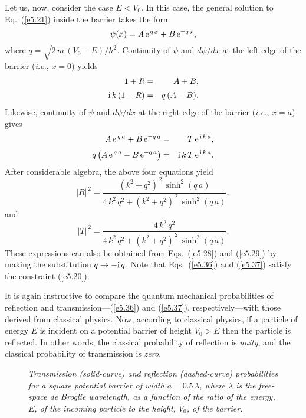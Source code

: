 Let us, now, consider the case $E< V_0$. In this case, the general
solution to Eq.~(\ref{e5.21}) inside the barrier takes the
form
\begin{equation}
\psi(x) = A\,{\rm e}^{\,q\,x} + B\,{\rm e}^{-q\,x},
\end{equation}
where $q=\sqrt{2\,m\,(V_0-E)/\hbar^2}$. 
Continuity of $\psi$ and $d \psi/d x$ at the left edge of
the barrier ({\em i.e.}, $x=0$) yields
\begin{eqnarray}
1 + R &=& A+B,\\[0.5ex]
{\rm i}\,k\,(1-R) &=& q\,(A-B).
\end{eqnarray}
Likewise, continuity of $\psi$ and $d\psi/d x$ at the right edge of
the barrier ({\em i.e.}, $x=a$) gives
\begin{eqnarray}
A\, {\rm e}^{\,q\,a}+ B \,{\rm e}^{-q\,a} &=& T\,{\rm e}^{\,{\rm i}\,k\,a},\\[0.5ex]
q\left(A\, {\rm e}^{\,q\,a}-B \,{\rm e}^{-q\,a}\right) &=& {\rm i}\,k\,T\,{\rm e}^{\,{\rm i}\,k\,a}.
\end{eqnarray}
After considerable algebra, the above four equations yield
\begin{equation}\label{e5.36}
|R|^{\,2} = \frac{(k^2+q^2)^{\,2}\,\sinh^2(q\,a)}{4\,k^2\,q^2 + (k^2+q^2)^{\,2}\,\sinh^2(q\,a)},
\end{equation}
and
\begin{equation}\label{e5.37}
|T|^{\,2} = \frac{4\,k^2\,q^2}{4\,k^2\,q^2 + (k^2+q^2)^{\,2}\,\sinh^2(q\,a)}.
\end{equation}
These expressions can also be obtained from Eqs.~(\ref{e5.28}) and
(\ref{e5.29}) by making the substitution $q\rightarrow -{\rm i}\,q$.
Note that Eqs.~(\ref{e5.36}) and (\ref{e5.37}) satisfy the constraint (\ref{e5.20}).

It is again instructive to compare the quantum mechanical probabilities
of reflection and transmission---(\ref{e5.36}) and (\ref{e5.37}), respectively---with those derived from classical physics. Now, according
to classical physics, if a particle of energy $E$ is incident on
a potential barrier of height $V_0>E$ then the particle is reflected.
In other words, the classical probability of reflection is
{\em unity}, and the classical probability of transmission is {\em zero}.

\begin{figure}
\epsfysize=2.8in
\centerline{}
\caption{\em Transmission (solid-curve) and reflection (dashed-curve) probabilities for a square potential barrier of width $a=0.5\,\lambda$, where $\lambda$ is the free-space de Broglie wavelength, as a function
of the ratio of the energy,  $E$, of the incoming particle to the
height, $V_0$, of the barrier.}\label{fb3}   
\end{figure}

